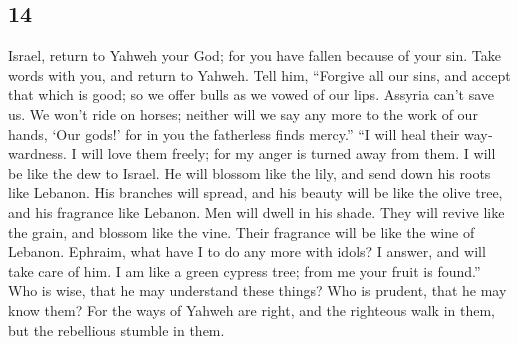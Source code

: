 \begin{paracol}{2}
\begin{otherlanguage}{english}
\hypertarget{section-27}{%
\section{14}\label{section-27}}

 Israel, return to Yahweh your God; for you have fallen
because of your sin.  Take words with you, and return to
Yahweh. Tell him, ``Forgive all our sins, and accept that which is good;
so we offer bulls as we vowed of our lips.  Assyria can't
save us. We won't ride on horses; neither will we say any more to the
work of our hands, `Our gods!' for in you the fatherless finds mercy.''
 ``I will heal their waywardness. I will love them freely;
for my anger is turned away from them.  I will be like the
dew to Israel. He will blossom like the lily, and send down his roots
like Lebanon.  His branches will spread, and his beauty
will be like the olive tree, and his fragrance like Lebanon.
 Men will dwell in his shade. They will revive like the
grain, and blossom like the vine. Their fragrance will be like the wine
of Lebanon.  Ephraim, what have I to do any more with
idols? I answer, and will take care of him. I am like a green cypress
tree; from me your fruit is found.''  Who is wise, that he
may understand these things? Who is prudent, that he may know them? For
the ways of Yahweh are right, and the righteous walk in them, but the
rebellious stumble in them. \end{otherlanguage}
\end{paracol}
